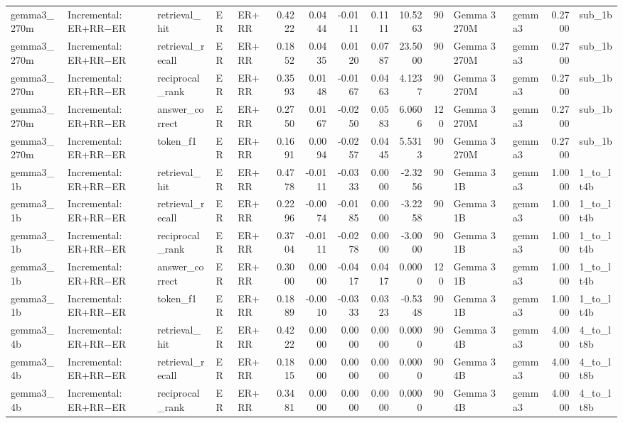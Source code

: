 \begin{tabular}{lllllrrrrrrllrl}
gemma3_270m & Incremental: ER+RR−ER & retrieval_hit & ER & ER+RR & 0.4222 & 0.0444 & -0.0111 & 0.1111 & 10.5263 & 90 & Gemma 3 270M & gemma3 & 0.2700 & sub_1b \\
gemma3_270m & Incremental: ER+RR−ER & retrieval_recall & ER & ER+RR & 0.1852 & 0.0435 & 0.0120 & 0.0787 & 23.5000 & 90 & Gemma 3 270M & gemma3 & 0.2700 & sub_1b \\
gemma3_270m & Incremental: ER+RR−ER & reciprocal_rank & ER & ER+RR & 0.3593 & 0.0148 & -0.0167 & 0.0463 & 4.1237 & 90 & Gemma 3 270M & gemma3 & 0.2700 & sub_1b \\
gemma3_270m & Incremental: ER+RR−ER & answer_correct & ER & ER+RR & 0.2750 & 0.0167 & -0.0250 & 0.0583 & 6.0606 & 120 & Gemma 3 270M & gemma3 & 0.2700 & sub_1b \\
gemma3_270m & Incremental: ER+RR−ER & token_f1 & ER & ER+RR & 0.1691 & 0.0094 & -0.0257 & 0.0445 & 5.5313 & 90 & Gemma 3 270M & gemma3 & 0.2700 & sub_1b \\
gemma3_1b & Incremental: ER+RR−ER & retrieval_hit & ER & ER+RR & 0.4778 & -0.0111 & -0.0333 & 0.0000 & -2.3256 & 90 & Gemma 3 1B & gemma3 & 1.0000 & 1_to_lt4b \\
gemma3_1b & Incremental: ER+RR−ER & retrieval_recall & ER & ER+RR & 0.2296 & -0.0074 & -0.0185 & 0.0000 & -3.2258 & 90 & Gemma 3 1B & gemma3 & 1.0000 & 1_to_lt4b \\
gemma3_1b & Incremental: ER+RR−ER & reciprocal_rank & ER & ER+RR & 0.3704 & -0.0111 & -0.0278 & 0.0000 & -3.0000 & 90 & Gemma 3 1B & gemma3 & 1.0000 & 1_to_lt4b \\
gemma3_1b & Incremental: ER+RR−ER & answer_correct & ER & ER+RR & 0.3000 & 0.0000 & -0.0417 & 0.0417 & 0.0000 & 120 & Gemma 3 1B & gemma3 & 1.0000 & 1_to_lt4b \\
gemma3_1b & Incremental: ER+RR−ER & token_f1 & ER & ER+RR & 0.1889 & -0.0010 & -0.0333 & 0.0323 & -0.5348 & 90 & Gemma 3 1B & gemma3 & 1.0000 & 1_to_lt4b \\
gemma3_4b & Incremental: ER+RR−ER & retrieval_hit & ER & ER+RR & 0.4222 & 0.0000 & 0.0000 & 0.0000 & 0.0000 & 90 & Gemma 3 4B & gemma3 & 4.0000 & 4_to_lt8b \\
gemma3_4b & Incremental: ER+RR−ER & retrieval_recall & ER & ER+RR & 0.1815 & 0.0000 & 0.0000 & 0.0000 & 0.0000 & 90 & Gemma 3 4B & gemma3 & 4.0000 & 4_to_lt8b \\
gemma3_4b & Incremental: ER+RR−ER & reciprocal_rank & ER & ER+RR & 0.3481 & 0.0000 & 0.0000 & 0.0000 & 0.0000 & 90 & Gemma 3 4B & gemma3 & 4.0000 & 4_to_lt8b \\

\end{tabular}
